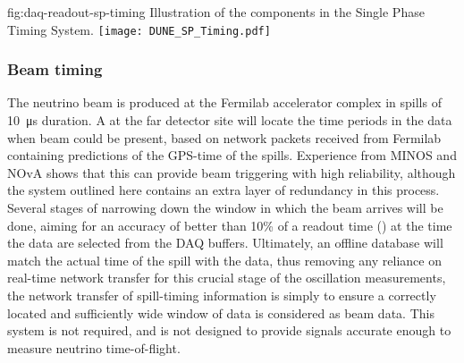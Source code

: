 \begin{dunefigure}{fig:daq-readout-sp-timing}
  {Illustration of the components in the Single Phase Timing System.}
  \texttt{[image: DUNE\_SP\_Timing.pdf]}
\end{dunefigure}

\subsubsection{Beam timing}
\label{sec:fdsp-daq-design-beamtiming}

The neutrino beam is produced at the Fermilab accelerator complex in
spills of \SI{10}{\us} duration.  A  at the far
detector site will locate the time periods in the data when beam could
be present, based on network packets received from Fermilab containing
predictions of the GPS-time of the spills.  Experience from
MINOS and NOvA shows that this can provide beam triggering with high
reliability, although the system outlined here contains an extra layer
of redundancy in this process.  Several stages of narrowing down the
window in which the beam arrives will be done, aiming for an accuracy
of better than 10\% of a readout time (\readout) at the time the data
are selected from the DAQ buffers.  Ultimately, an offline database
will match the actual time of the spill with the data, thus removing
any reliance on real-time network transfer for this crucial stage of
the oscillation measurements, the network transfer of spill-timing
information is simply to ensure a correctly located and sufficiently
wide window of data is considered as beam data. This system is not
required, and is not designed to provide signals accurate enough to
measure neutrino time-of-flight.

